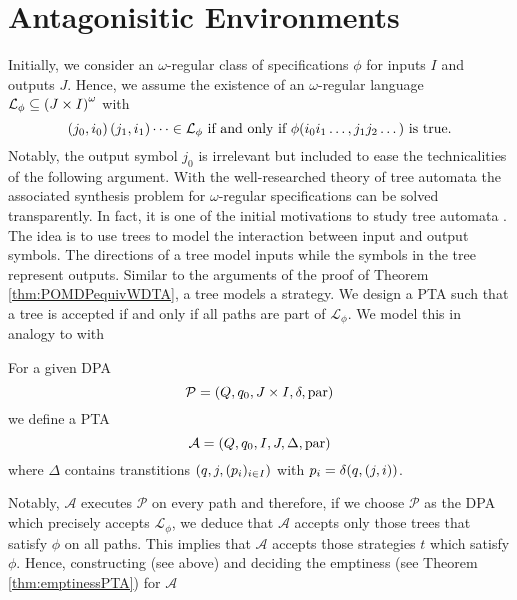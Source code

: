 \section{Antagonisitic Environments}
Initially, we consider an $\omega$-regular class of specifications
$\phi$ for inputs $I$ and outputs $J$. Hence, we assume the existence of an
$\omega$-regular language $\mathcal{L}_{\phi}\subseteq
\left(J\times I\right)^{\omega}$ with
\begin{equation}
  \left(j_{0}, i_{0}\right)\left(j_{1}, i_{1}\right)\dots\in\mathcal{L}_{\phi}
  \text{ if and only if }
  \phi(i_{0}i_{1}\dots, j_{1}j_{2}\dots)\text{ is true.}
  \label{eq:omegaregularphi}
\end{equation}
Notably, the output symbol $j_{0}$ is irrelevant but included to ease the
technicalities of the following argument. With the well-researched theory of
tree automata the associated synthesis problem for $\omega$-regular
specifications can be solved transparently. In fact, it is one of the
initial motivations to study tree automata \cite{AutoInfObj}. The idea is to
use trees to model the interaction between input and output symbols. The
directions of a tree model inputs while the symbols in the tree represent
outputs. Similar to the arguments of the proof of Theorem
\ref{thm:POMDPequivWDTA}, a tree models a strategy. We design a \ac{PTA} such
that a tree is accepted if and only if all paths are part of
$\mathcal{L}_{\phi}$. We model this in analogy to \cite[Lemma 15]{AutoInfObj}
with
\begin{definition}
  For a given \ac{DPA}
  \begin{equation*}
    \mathcal{P} = \left(Q, q_{0}, J\times I, \delta, \operatorname{par}\right)
  \end{equation*}
  we define a \ac{PTA}
  \begin{equation*}
    \mathcal{A} = \left(Q, q_{0}, I, J, \Delta, \operatorname{par}\right)
  \end{equation*}
  where $\Delta$ contains transtitions $\left(q, j, (p_{i})_{i\in I}\right)$ with
  $p_{i} = \delta(q, \left(j, i\right))$.
\end{definition}
Notably, $\mathcal{A}$ executes $\mathcal{P}$ on every path and therefore, if
we choose $\mathcal{P}$ as the \ac{DPA} which precisely accepts
$\mathcal{L}_{\phi}$, we deduce that $\mathcal{A}$ accepts only those trees
that satisfy $\phi$ on all paths. This implies that $\mathcal{A}$ accepts those
strategies $t$ which satisfy $\phi$. Hence, constructing (see above) and
deciding the emptiness (see Theorem \ref{thm:emptinessPTA}) for $\mathcal{A}$
